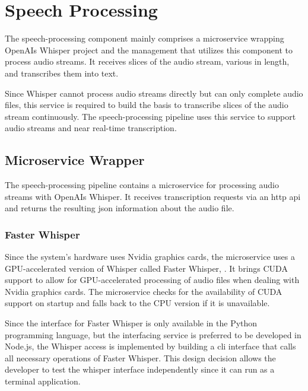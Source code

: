 \chapter{Speech Processing}

\label{SpeechProcessing}

The speech-processing component mainly comprises a microservice wrapping OpenAIs Whisper project and the management 
that utilizes this component to process audio streams. It receives slices of the audio stream, various in length, and
transcribes them into text.

Since Whisper cannot process audio streams directly but can only complete audio files, this service is required to 
build the basis to transcribe slices of the audio stream continuously. The speech-processing pipeline uses this service 
to support audio streams and near real-time transcription.


\section{Microservice Wrapper}

The speech-processing pipeline contains a microservice for processing audio streams with OpenAIs Whisper. It receives 
transcription requests via an \ac{http} \ac{api} and returns the resulting \ac{json} information about the audio file.

\subsection{Faster Whisper}

Since the system's hardware uses Nvidia graphics cards, the microservice uses a GPU-accelerated version of Whisper 
called Faster Whisper, \cite{fasterwhisper2023github}. It brings CUDA support to allow for GPU-accelerated processing 
of audio files when dealing with Nvidia graphics cards. The microservice checks for the availability of CUDA support on 
startup and falls back to the CPU version if it is unavailable.

Since the interface for Faster Whisper is only available in the Python programming language, but the interfacing 
service is preferred to be developed in Node.js, the Whisper access is implemented by building a \ac{cli} interface 
that calls all necessary operations of Faster Whisper. This design decision allows the developer to test the whisper 
interface independently since it can run as a terminal application.

